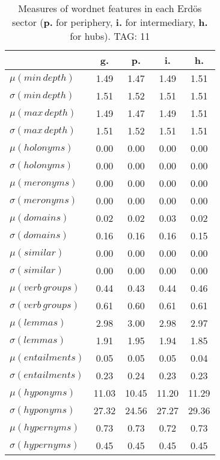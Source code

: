\begin{table}[h!]
\begin{center}
\begin{tabular}{| l || c | c | c | c |}\hline
 & {\bf g.} & {\bf p.} & {\bf i.} & {\bf h.} \\\hline\hline
$\mu(min\,depth)$ & 1.49  & 1.47  & 1.49  & 1.51 \\
$\sigma(min\,depth)$ & 1.51  & 1.52  & 1.51  & 1.51 \\\hline
$\mu(max\,depth)$ & 1.49  & 1.47  & 1.49  & 1.51 \\
$\sigma(max\,depth)$ & 1.51  & 1.52  & 1.51  & 1.51 \\\hline
$\mu(holonyms)$ & 0.00  & 0.00  & 0.00  & 0.00 \\
$\sigma(holonyms)$ & 0.00  & 0.00  & 0.00  & 0.00 \\\hline
$\mu(meronyms)$ & 0.00  & 0.00  & 0.00  & 0.00 \\
$\sigma(meronyms)$ & 0.00  & 0.00  & 0.00  & 0.00 \\\hline
$\mu(domains)$ & 0.02  & 0.02  & 0.03  & 0.02 \\
$\sigma(domains)$ & 0.16  & 0.16  & 0.16  & 0.15 \\\hline
$\mu(similar)$ & 0.00  & 0.00  & 0.00  & 0.00 \\
$\sigma(similar)$ & 0.00  & 0.00  & 0.00  & 0.00 \\\hline
$\mu(verb\,groups)$ & 0.44  & 0.43  & 0.44  & 0.46 \\
$\sigma(verb\,groups)$ & 0.61  & 0.60  & 0.61  & 0.61 \\\hline
$\mu(lemmas)$ & 2.98  & 3.00  & 2.98  & 2.97 \\
$\sigma(lemmas)$ & 1.91  & 1.95  & 1.94  & 1.85 \\\hline
$\mu(entailments)$ & 0.05  & 0.05  & 0.05  & 0.04 \\
$\sigma(entailments)$ & 0.23  & 0.24  & 0.23  & 0.23 \\\hline
$\mu(hyponyms)$ & 11.03  & 10.45  & 11.20  & 11.29 \\
$\sigma(hyponyms)$ & 27.32  & 24.56  & 27.27  & 29.36 \\\hline
$\mu(hypernyms)$ & 0.73  & 0.73  & 0.72  & 0.73 \\
$\sigma(hypernyms)$ & 0.45  & 0.45  & 0.45  & 0.45 \\\hline
\end{tabular}
\caption{Measures of wordnet features in each Erd\"os sector ({{\bf p.}} for periphery, {{\bf i.}} for intermediary, {{\bf h.}} for hubs). TAG: 11}
\end{center}
\end{table}
